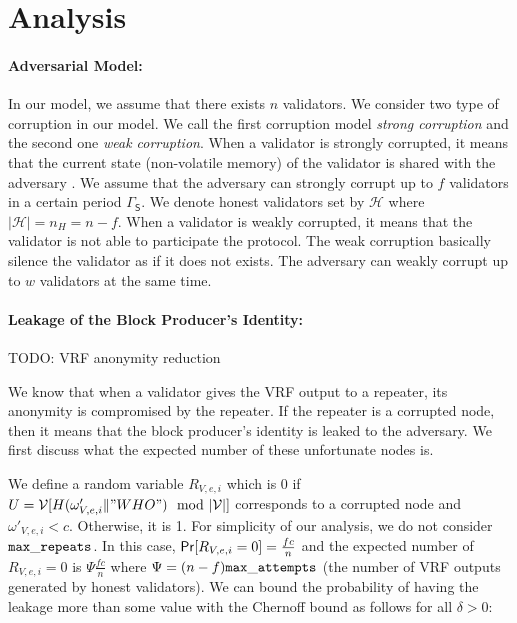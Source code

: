 \newcommand{\nweak}{\ensuremath{w}}
\newcommand{\strongperiod}{\ensuremath{\mathsf{\Gamma_S}}}
\newcommand{\thweak}{\ensuremath{\tau_w}}
\newcommand{\numleak}{\ensuremath{\mathsf{leak}}}
\newcommand{\numanom}{\ensuremath{\mathfrak{A}}}
\section{Analysis}

\paragraph{Adversarial Model:} In our model, we assume that there exists $ n $ validators.  We consider two type of corruption in our model. We call the first corruption model \emph{strong corruption} and the second one \emph{weak corruption}. When a validator is strongly corrupted, it means that the current state (non-volatile memory) of the validator is shared with the adversary . We assume that the adversary can strongly corrupt up to $ f $ validators in a certain period $\strongperiod$.  We denote honest validators set by $ \mathcal{H} $ where $ |\mathcal{H}| = n_H = n-f $. 
When a validator is weakly corrupted, it means that the validator is not able to participate the protocol. The weak corruption basically silence the validator as if it does not exists. The adversary can weakly corrupt up to $ \nweak $ validators at the same time. 


\paragraph{Leakage of the Block Producer's Identity:}

TODO: VRF anonymity reduction

We know that when a validator gives the VRF output to a repeater, its anonymity is compromised by the repeater. If the repeater is a corrupted node, then it means that the block producer's identity is leaked to the adversary. We first discuss what the expected number of these unfortunate nodes is. 


We define a random variable $ R_{V,e,i} $ which is 0 if $ U = \mathcal{V}[H(\omega'_{V,e,i} \| "WHO") \mod |\mathcal{V}|]  $ corresponds to a corrupted node and $ \omega'_{V,e,i} < c $. Otherwise, it is 1. For simplicity of our analysis, we do not consider $ \mathtt{max\_repeats} $. In this case, $ \mathsf{Pr}[R_{V,e,i} = 0] = \frac{fc}{n} $ and
the expected number of $ R_{V,e,i}  = 0$ is  $ \Psi \frac{fc}{n} $ where $ \Psi = (n-f) \mathtt{max\_attempts} $ (the number of VRF outputs generated by honest validators). We can bound the probability of having the leakage more than some value with the Chernoff bound as follows for all $ \delta > 0 	 $:

